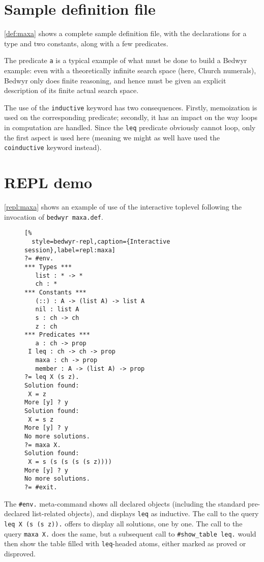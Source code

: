 \documentclass[a4paper,twocolumn]{article}
\begin{document}
\section{Sample definition file}

\autoref{def:maxa} shows a complete sample definition file,
with the declarations for a type and two constants, along with a few predicates.

\begin{figure}[t]
  
\end{figure}

The predicate \lstinline+a+ is a typical example of what must be done to build
a Bedwyr example: even with a theoretically infinite search space
(here, Church numerals), Bedwyr only does finite reasoning, and hence must be
given an explicit description of its finite actual search space.

The use of the \lstinline+inductive+ keyword has two consequences.
Firstly, memoization is used on the corresponding predicate;
secondly, it has an impact on the way loops in computation are handled.
Since the \lstinline+leq+ predicate obviously cannot loop,
only the first aspect is used here (meaning we might as well have used the
\lstinline+coinductive+ keyword instead).

\section{REPL demo}

\autoref{repl:maxa} shows an example of use of the interactive toplevel
following the invocation of \verb+bedwyr maxa.def+.

\begin{figure}[t]\begin{lstlisting}[%
  style=bedwyr-repl,caption={Interactive session},label=repl:maxa]
?= #env.
*** Types ***
   list : * -> *
   ch : *
*** Constants ***
   (::) : A -> (list A) -> list A
   nil : list A
   s : ch -> ch
   z : ch
*** Predicates ***
   a : ch -> prop
 I leq : ch -> ch -> prop
   maxa : ch -> prop
   member : A -> (list A) -> prop
?= leq X (s z).
Solution found:
 X = z
More [y] ? y
Solution found:
 X = s z
More [y] ? y
No more solutions.
?= maxa X.
Solution found:
 X = s (s (s (s (s z))))
More [y] ? y
No more solutions.
?= #exit.
\end{lstlisting}\end{figure}

The \lstinline+#env.+ meta-command shows all declared objects
(including the standard pre-declared list-related objects),
and displays \lstinline+leq+ as inductive.
The call to the query \lstinline+leq X (s (s z)).+ offers to display all
solutions, one by one.
The call to the query \lstinline+maxa X.+ does the same,
but a subsequent call to \lstinline+#show_table leq.+ would then show the table
filled with \lstinline+leq+-headed atoms, either marked as proved or disproved.
\end{document}
